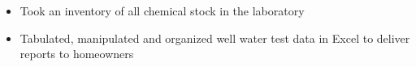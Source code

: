 \begin{itemize}
  \item Took an inventory of all chemical stock in the laboratory
  \item Tabulated, manipulated and organized well water test data in Excel to
  deliver reports to homeowners
\end{itemize}
\normalsize
\medskip
